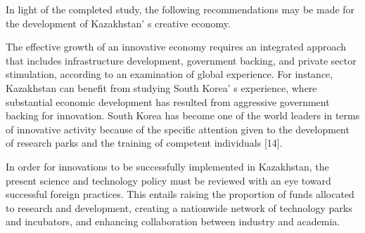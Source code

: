 
In light of the completed study, the following recommendations may be
made for the development of Kazakhstan' s creative
economy.

The effective growth of an innovative economy requires an integrated
approach that includes infrastructure development, government backing,
and private sector stimulation, according to an examination of global
experience. For instance, Kazakhstan can benefit from studying South
Korea' s experience, where substantial economic
development has resulted from aggressive government backing for
innovation. South Korea has become one of the world leaders in terms of
innovative activity because of the specific attention given to the
development of research parks and the training of competent individuals
{[}14{]}.

In order for innovations to be successfully implemented in Kazakhstan,
the present science and technology policy must be reviewed with an eye
toward successful foreign practices. This entails raising the proportion
of funds allocated to research and development, creating a nationwide
network of technology parks and incubators, and enhancing collaboration
between industry and academia.

